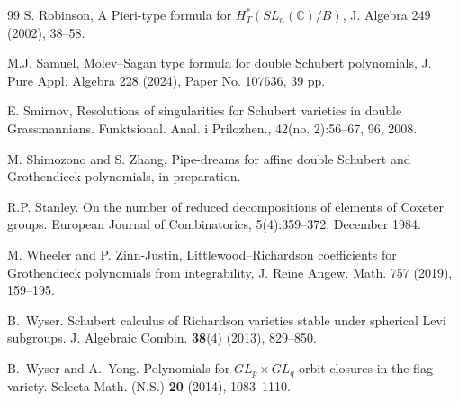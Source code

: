\documentclass[12pt,reqno]{amsart}
\numberwithin{equation}{section}
\theoremstyle{definition}
\begin{document}
\begin{thebibliography}{99}
S. Robinson, A Pieri-type formula for $H^*_T(SL_n(\mathbb{C})/B)$,  J. Algebra  249 (2002), 38--58.

M.J. Samuel, Molev--Sagan type formula for double Schubert polynomials, J. Pure Appl. Algebra 228 (2024),  Paper No. 107636, 39 pp.


E.  Smirnov, Resolutions of singularities for Schubert varieties in double
Grassmannians. Funktsional. Anal. i Prilozhen., 42(no. 2):56–67, 96, 2008.


M. Shimozono and S. Zhang, Pipe-dreams for affine double Schubert and Grothendieck polynomials, in preparation.

R.P. Stanley. On the number of reduced decompositions of elements of Coxeter groups. European Journal of Combinatorics, 5(4):359–372, December 1984.



 


M. Wheeler and P. Zinn-Justin, Littlewood--Richardson coefficients for Grothendieck polynomials from integrability, J. Reine Angew. Math. 757 (2019), 159–195.

B.~Wyser.
\newblock Schubert calculus of Richardson varieties stable under spherical Levi subgroups.
\newblock J. Algebraic Combin. \textbf{38}(4) (2013), 829--850.


B.~Wyser and A.~Yong.
\newblock Polynomials for ${GL}_p\times {GL}_q$ orbit closures in the flag variety.
\newblock Selecta Math. (N.S.) \textbf{20} (2014), 1083--1110.


\end{thebibliography}
\end{document}
